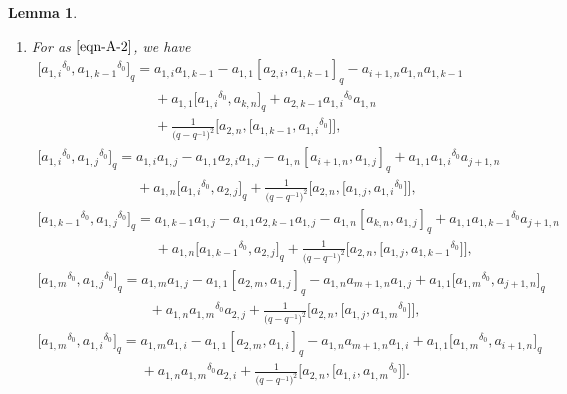 \documentclass[pdftex]{sigma}
\numberwithin{equation}{section}
\def\lr#1{\left[#1\right]}
\def\d{\delta}
\def\A{\mathscr{A}}
\newtheorem{Lemma}[Theorem]{Lemma}
\begin{document}
\begin{Lemma}\quad
\begin{enumerate}\itemsep=0pt
\item[$(1)$] For \smash{$\A_{1,k,i+1}^{i,j,m} $} as $\eqref{eqn-A-2}$, we have
\begin{gather}%
\bigl[{a_{1,i}}^{\d_0},{a_{1,k-1}}^{\d_0}]_q =a_{1,i}a_{1,k-1}-a_{1,1}\lr{a_{2,i},a_{1,k-1}}_q -a_{i+1,n}a_{1,n}a_{1,k-1} \nonumber\\
\phantom{\bigl[{a_{1,i}}^{\d_0},{a_{1,k-1}}^{\d_0}\bigr]_q =}{}+a_{1,1}\bigl[{a_{1,i}}^{\d_0},a_{k,n}\bigr]_q
+a_{2,k-1}{a_{1,i}}^{\d_0}a_{1,n}\nonumber\\
\phantom{\bigl[{a_{1,i}}^{\d_0},{a_{1,k-1}}^{\d_0}\bigr]_q =}{}+\frac{1}{\bigl(q-q^{-1}\bigr)^2}\bigl[a_{2,n}, \bigl[a_{1,k-1}, {a_{1,i}}^{\d_0}\bigr]\bigr] , \label{r0-1}\\
\bigl[{a_{1,i}}^{\d_0},{a_{1,j}}^{\d_0} \bigr]_q =a_{1,i}a_{1,j} -a_{1,1}a_{2,i}a_{1,j} -a_{1,n}\lr{a_{i+1,n},a_{1,j}}_q +a_{1,1}{a_{1,i}}^{\d_0}a_{j+1,n} \nonumber\\
\phantom{\bigl[{a_{1,i}}^{\d_0},{a_{1,j}}^{\d_0} \bigr]_q =}{}
+a_{1,n}\bigl[{a_{1,i}}^{\d_0},a_{2,j}\bigr]_q+\frac{1}{\bigl(q-q^{-1}\bigr)^2}\bigl[a_{2,n}, \bigl[a_{1,j}, {a_{1,i}}^{\d_0}\bigr]\bigr],\label{r0-2}\\
\bigl[{a_{1,k-1}}^{\d_0},{a_{1,j}}^{\d_0}\bigr]_q =a_{1,k-1}a_{1,j}-a_{1,1}a_{2,k-1}a_{1,j} -a_{1,n}\lr{a_{k,n},a_{1,j}}_q +a_{1,1}{a_{1,k-1}}^{\d_0}a_{j+1,n} \nonumber\\
\phantom{\bigl[{a_{1,k-1}}^{\d_0},{a_{1,j}}^{\d_0}\bigr]_q =}{}
+a_{1,n}\bigl[{a_{1,k-1}}^{\d_0},a_{2,j}\bigr]_q+\frac{1}{\bigl(q-q^{-1}\bigr)^2}\bigl[a_{2,n}, \bigl[a_{1,j}, {a_{1,k-1}}^{\d_0}\bigr]\bigr], \label{r0-3}\\
\bigl[{a_{1,m}}^{\d_0},{a_{1,j}}^{\d_0}\bigr]_q
=a_{1,m}a_{1,j}- a_{1,1}\lr{a_{2,m},a_{1,j}}_q -a_{1,n}a_{m+1,n}a_{1,j} +a_{1,1}\bigl[{a_{1,m}}^{\d_0},a_{j+1,n}\bigr]_q \nonumber\\
\phantom{\bigl[{a_{1,m}}^{\d_0},{a_{1,j}}^{\d_0}\bigr]_q
=a}{}
+a_{1,n}{a_{1,m}}^{\d_0}a_{2,j}+\frac{1}{\bigl(q-q^{-1}\bigr)^2}\bigl[a_{2,n}, \bigl[a_{1,j}, {a_{1,m}}^{\d_0}\bigr]\bigr],\nonumber\\
\bigl[{a_{1,m}}^{\d_0},{a_{1,i}}^{\d_0}\bigr]_q
=a_{1,m}a_{1,i} -a_{1,1}\lr{a_{2,m},a_{1,i}}_q -a_{1,n}a_{m+1,n}a_{1,i} +a_{1,1}\bigl[{a_{1,m}}^{\d_0},a_{i+1,n}\bigr]_q \nonumber\\
\phantom{\bigl[{a_{1,m}}^{\d_0},{a_{1,i}}^{\d_0}\bigr]_q
=}{}
+a_{1,n}{a_{1,m}}^{\d_0}a_{2,i}+\frac{1}{\bigl(q-q^{-1}\bigr)^2}\bigl[a_{2,n}, \bigl[a_{1,i}, {a_{1,m}}^{\d_0}\bigr]\bigr].\nonumber

\end{gather}
\end{enumerate}
\end{Lemma}
\end{document}
